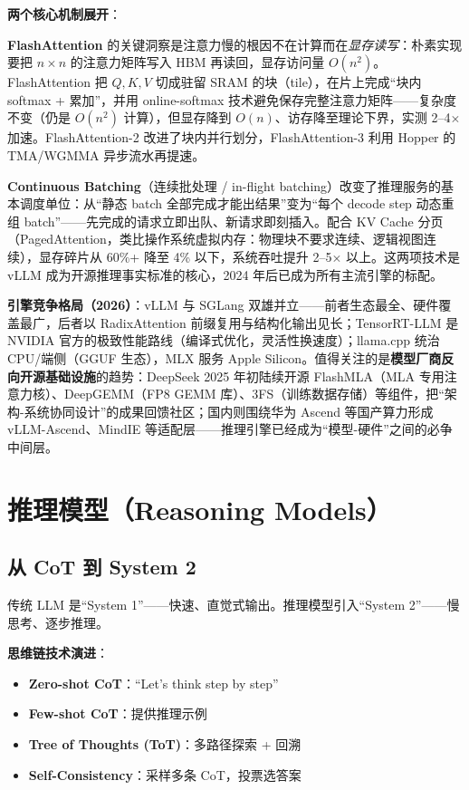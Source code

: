\documentclass[12pt,a4paper]{article}
\begin{document}
\textbf{两个核心机制展开}：

\textbf{FlashAttention} 的关键洞察是注意力慢的根因不在计算而在\emph{显存读写}：朴素实现要把 $n \times n$ 的注意力矩阵写入 HBM 再读回，显存访问量 $O(n^2)$。FlashAttention 把 $Q, K, V$ 切成驻留 SRAM 的块（tile），在片上完成“块内 softmax + 累加”，并用 online-softmax 技术避免保存完整注意力矩阵——复杂度不变（仍是 $O(n^2)$ 计算），但显存降到 $O(n)$、访存降至理论下界，实测 2--4$\times$ 加速。FlashAttention-2 改进了块内并行划分，FlashAttention-3 利用 Hopper 的 TMA/WGMMA 异步流水再提速。

\textbf{Continuous Batching}（连续批处理 / in-flight batching）改变了推理服务的基本调度单位：从“静态 batch 全部完成才能出结果”变为“每个 decode step 动态重组 batch”——先完成的请求立即出队、新请求即刻插入。配合 KV Cache 分页（PagedAttention，类比操作系统虚拟内存：物理块不要求连续、逻辑视图连续），显存碎片从 60\%+ 降至 4\% 以下，系统吞吐提升 2--5$\times$ 以上。这两项技术是 vLLM 成为开源推理事实标准的核心，2024 年后已成为所有主流引擎的标配。

\textbf{引擎竞争格局（2026）}：vLLM 与 SGLang 双雄并立——前者生态最全、硬件覆盖最广，后者以 RadixAttention 前缀复用与结构化输出见长；TensorRT-LLM 是 NVIDIA 官方的极致性能路线（编译式优化，灵活性换速度）；llama.cpp 统治 CPU/端侧（GGUF 生态），MLX 服务 Apple Silicon。值得关注的是\textbf{模型厂商反向开源基础设施}的趋势：DeepSeek 2025 年初陆续开源 FlashMLA（MLA 专用注意力核）、DeepGEMM（FP8 GEMM 库）、3FS（训练数据存储）等组件，把“架构-系统协同设计”的成果回馈社区；国内则围绕华为 Ascend 等国产算力形成 vLLM-Ascend、MindIE 等适配层——推理引擎已经成为“模型-硬件”之间的必争中间层。

\section{推理模型（Reasoning Models）}

\subsection{从 CoT 到 System 2}

传统 LLM 是“System 1”——快速、直觉式输出。推理模型引入“System 2”——慢思考、逐步推理。

\textbf{思维链技术演进}：
\begin{itemize}
  \item \textbf{Zero-shot CoT}：“Let's think step by step”
  \item \textbf{Few-shot CoT}：提供推理示例
  \item \textbf{Tree of Thoughts (ToT)}：多路径探索 + 回溯
  \item \textbf{Self-Consistency}：采样多条 CoT，投票选答案
\end{itemize}
\end{document}
